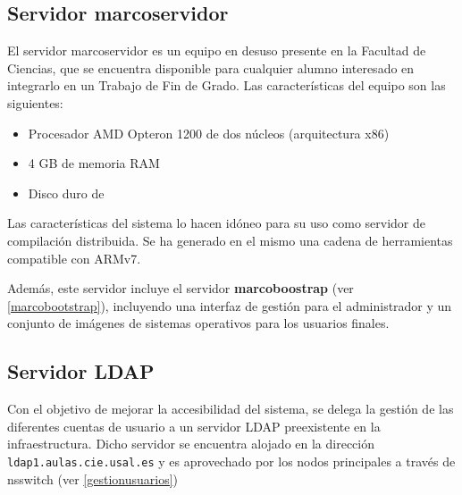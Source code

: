 \subsection{Servidor marcoservidor}

El servidor marcoservidor es un equipo en desuso presente en la Facultad de Ciencias, que se encuentra disponible para cualquier alumno interesado en integrarlo en un Trabajo de Fin de Grado. Las características del equipo son las siguientes:

\begin{itemize}
	\item Procesador AMD Opteron 1200 de dos núcleos (arquitectura x86)%
	\item 4 GB de memoria RAM
	\item Disco duro de %
\end{itemize}

Las características del sistema lo hacen idóneo para su uso como servidor de compilación distribuida. Se ha generado en el mismo una cadena de herramientas compatible con ARMv7.%

Además, este servidor incluye el servidor \textbf{marcoboostrap} (ver \ref{marcobootstrap}), incluyendo una interfaz de gestión para el administrador y un conjunto de imágenes de sistemas operativos para los usuarios finales.

\subsection{Servidor LDAP}

Con el objetivo de mejorar la accesibilidad del sistema, se delega la gestión de las diferentes cuentas de usuario a un servidor LDAP preexistente en la infraestructura. Dicho servidor se encuentra alojado en la dirección \texttt{ldap1.aulas.cie.usal.es} y es aprovechado por los nodos principales a través de nsswitch (ver \ref{gestionusuarios}) 